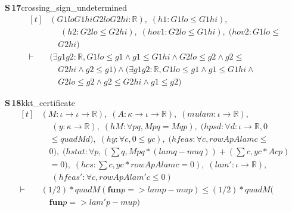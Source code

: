 \documentclass[conference]{IEEEtran}
\theoremstyle{definition}
\newcommand{\lean}[1]{\textsf{\footnotesize #1}}
\begin{document}
\noindent\textbf{S\,17}\quad\lean{crossing\_sign\_undetermined}
{\footnotesize\[ \begin{aligned}[t]
&(\mathit{G1lo} \mathit{G1hi} \mathit{G2lo} \mathit{G2hi} : \mathbb{R} ),\; (\mathit{h1} : \mathit{G1lo} \leq \mathit{G1hi}),\\
&\quad \; (\mathit{h2} : \mathit{G2lo} \leq \mathit{G2hi}),\; (\mathit{hov1} : \mathit{G2lo} \leq \mathit{G1hi}),\; (\mathit{hov2} : \mathit{G1lo} \leq\\
&\quad \mathit{G2hi})\\
\vdash\;&(\exists \mathit{g1} \mathit{g2} : \mathbb{R} , \mathit{G1lo} \leq \mathit{g1} \wedge \mathit{g1} \leq \mathit{G1hi} \wedge \mathit{G2lo} \leq \mathit{g2} \wedge \mathit{g2} \leq\\
&\quad \mathit{G2hi} \wedge \mathit{g2} \leq \mathit{g1}) \wedge (\exists \mathit{g1} \mathit{g2} : \mathbb{R} , \mathit{G1lo} \leq \mathit{g1} \wedge \mathit{g1} \leq \mathit{G1hi} \wedge\\
&\quad \mathit{G2lo} \leq \mathit{g2} \wedge \mathit{g2} \leq \mathit{G2hi} \wedge \mathit{g1} \leq \mathit{g2})
\end{aligned} \]}

\noindent\textbf{S\,18}\quad\lean{kkt\_certificate}
{\footnotesize\[ \begin{aligned}[t]
&(\mathit{M} : \iota \to \iota \to \mathbb{R} ),\; (\mathit{A} : \kappa \to \iota \to \mathbb{R} ),\; (\mathit{mu} \mathit{lam} : \iota \to \mathbb{R} ),\\
&\quad \; (\mathit{y} : \kappa \to \mathbb{R} ),\; (\mathit{hM} : \forall \mathit{p} \mathit{q}, \mathit{M} \mathit{p} \mathit{q} = \mathit{M} \mathit{q} \mathit{p}),\; (\mathit{hpsd} : \forall \mathit{d} : \iota \to \mathbb{R} , 0\\
&\quad \leq \mathit{quad} \mathit{M} \mathit{d}),\; (\mathit{hy} : \forall \mathit{c}, 0 \leq \mathit{y} \mathit{c}),\; (\mathit{hfeas} : \forall \mathit{c}, \mathit{rowAp} \mathit{A} \mathit{lam} \mathit{c} \leq\\
&\quad 0),\; (\mathit{hstat} : \forall \mathit{p}, (\textstyle\sum \mathit{q}, \mathit{M} \mathit{p} \mathit{q} * (\mathit{lam} \mathit{q} - \mathit{mu} \mathit{q})) + (\textstyle\sum \mathit{c}, \mathit{y} \mathit{c} * \mathit{A} \mathit{c} \mathit{p})\\
&\quad = 0),\; (\mathit{hcs} : \textstyle\sum \mathit{c}, \mathit{y} \mathit{c} * \mathit{rowAp} \mathit{A} \mathit{lam} \mathit{c} = 0),\; (\mathit{lam'} : \iota \to \mathbb{R} ),\\
&\quad \; (\mathit{hfeas'} : \forall \mathit{c}, \mathit{rowAp} \mathit{A} \mathit{lam'} \mathit{c} \leq 0)\\
\vdash\;&(1/2) * \mathit{quad} \mathit{M} (\mathbf{fun} \mathit{p} => \mathit{lam} \mathit{p} - \mathit{mu} \mathit{p}) \leq (1/2) * \mathit{quad} \mathit{M} (\\
&\quad \mathbf{fun} \mathit{p} => \mathit{lam'} \mathit{p} - \mathit{mu} \mathit{p})
\end{aligned} \]}
\end{document}
